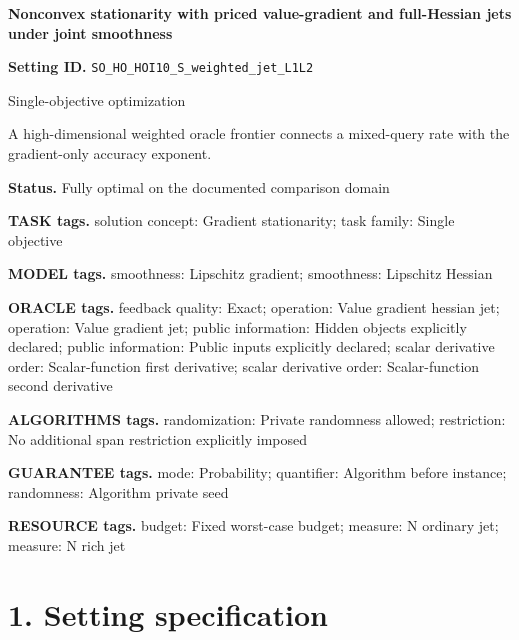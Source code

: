 \documentclass[10pt,a4paper]{article}
\begin{document}
\raggedright

{\LARGE\bfseries\sffamily\color{AtlasNavy} Nonconvex stationarity with priced value-gradient and full-Hessian jets under joint smoothness\par}\vspace{5pt}


\textbf{Setting ID.} \texttt{SO\_\allowbreak{}HO\_\allowbreak{}HOI10\_\allowbreak{}S\_\allowbreak{}weighted\_\allowbreak{}jet\_\allowbreak{}L1L2}



Single-objective optimization



A high-dimensional weighted oracle frontier connects a mixed-query rate with the gradient-only accuracy exponent.



\textbf{Status.} Fully optimal on the documented comparison domain



\textbf{TASK tags.} solution concept: Gradient stationarity; task family: Single objective



\textbf{MODEL tags.} smoothness: Lipschitz gradient; smoothness: Lipschitz Hessian



\textbf{ORACLE tags.} feedback quality: Exact; operation: Value gradient hessian jet; operation: Value gradient jet; public information: Hidden objects explicitly declared; public information: Public inputs explicitly declared; scalar derivative order: Scalar-function first derivative; scalar derivative order: Scalar-function second derivative



\textbf{ALGORITHMS tags.} randomization: Private randomness allowed; restriction: No additional span restriction explicitly imposed



\textbf{GUARANTEE tags.} mode: Probability; quantifier: Algorithm before instance; randomness: Algorithm private seed



\textbf{RESOURCE tags.} budget: Fixed worst-case budget; measure: N ordinary jet; measure: N rich jet



\section{1. Setting specification}
\end{document}
